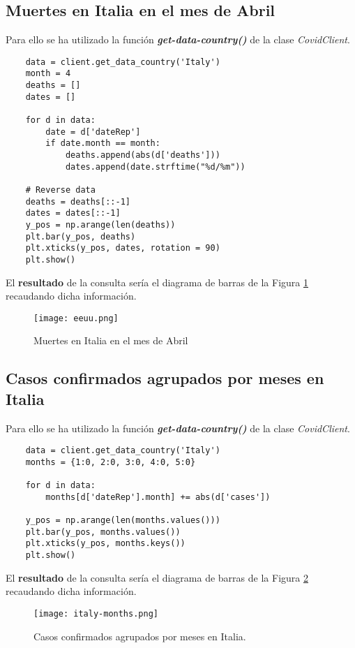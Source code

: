 \documentclass[11pt]{diazessay} %
\begin{document}
\newpage
\subsection*{Muertes en Italia en el mes de Abril}
Para ello se ha utilizado la función \textit{\textbf{get-data-country()}} \cite{jupyter} de la clase \textit{CovidClient}.

\lstset{language=Python}
\begin{lstlisting}
	data = client.get_data_country('Italy')
	month = 4
	deaths = []
	dates = []
	
	for d in data:
		date = d['dateRep']
		if date.month == month:
			deaths.append(abs(d['deaths']))
			dates.append(date.strftime("%d/%m"))
	
	# Reverse data
	deaths = deaths[::-1]
	dates = dates[::-1]
	y_pos = np.arange(len(deaths))
	plt.bar(y_pos, deaths)
	plt.xticks(y_pos, dates, rotation = 90)
	plt.show()
\end{lstlisting}

El \textbf{resultado} de la consulta sería el diagrama de barras de la Figura \ref{fig:eeuu} recaudando dicha información.

\begin{figure}[h!]
	\centering
	\texttt{[image: eeuu.png]}
	\caption{Muertes en Italia en el mes de Abril \cite{matplotlib}}
	\label{fig:eeuu}
\end{figure}

\newpage
\subsection*{Casos confirmados agrupados por meses en Italia}
Para ello se ha utilizado la función \textit{\textbf{get-data-country()}} \cite{jupyter} de la clase \textit{CovidClient}.

\lstset{language=Python}
\begin{lstlisting}
	data = client.get_data_country('Italy')
	months = {1:0, 2:0, 3:0, 4:0, 5:0}
	
	for d in data:
		months[d['dateRep'].month] += abs(d['cases'])
	
	y_pos = np.arange(len(months.values()))
	plt.bar(y_pos, months.values())
	plt.xticks(y_pos, months.keys())
	plt.show()
\end{lstlisting}

El \textbf{resultado} de la consulta sería el diagrama de barras de la Figura \ref{fig:italy} recaudando dicha información.

\begin{figure}[h!]
	\centering
	\texttt{[image: italy-months.png]}
	\caption{Casos confirmados agrupados por meses en Italia. \cite{matplotlib}}
	\label{fig:italy}
\end{figure}
\end{document}
